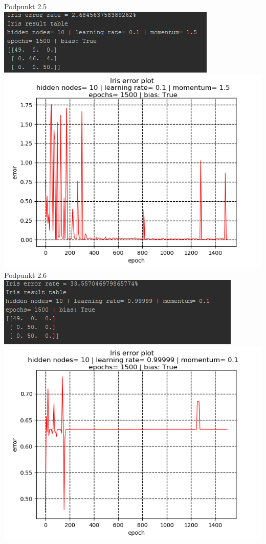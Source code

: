 \documentclass{classrep}
\begin{document}
{Podpunkt 2.5\\
\includegraphics{imgs/251.png}\\
\includegraphics{imgs/252.png}\\
Podpunkt 2.6\\
\includegraphics{imgs/261.png}\\
\includegraphics{imgs/262.png}\\
}
\end{document}
